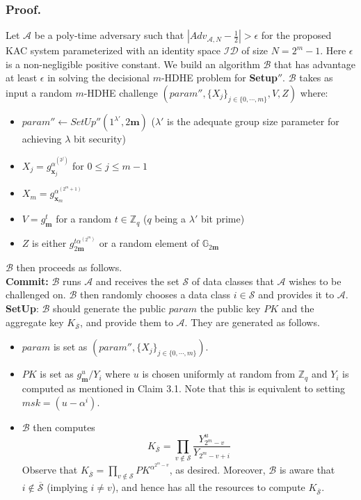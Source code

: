 \subsubsection{Proof.} Let $\mathcal{A}$ be a poly-time adversary such that $|Adv_{\mathcal{A},N}-\frac{1}{2}| > \epsilon$ for the proposed KAC system parameterized with an identity space $\mathcal{ID}$ of size $N=2^m-1$. Here $\epsilon$ is a non-negligible positive constant. We build an algorithm $\mathcal{B}$ that has advantage at least $\epsilon$ in solving the decisional $m$-HDHE problem for \textbf{Setup}$''$. $\mathcal{B}$ takes as input a random $m$-HDHE challenge $(param'',\{X_j\}_{j\in\{0,\cdots,m\}},V,Z)$ where:
\begin{itemize}
 \item $param''\leftarrow SetUp''(1^{\lambda'},2\mathbf{m})$ ($\lambda'$ is the adequate group size parameter for achieving $\lambda$ bit security)
 \item $X_j=g^{\alpha^{(2^j)}}_{\mathbf{x}_j}$ for $0\leq j \leq m-1$
 \item $X_m=g^{\alpha^{(2^m+1)}}_{\mathbf{x}_m}$
 \item $V=g^{t}_{\mathbf{m}}$ for a random $t\in\mathbb{Z}_q$ ($q$ being a $\lambda'$ bit prime)
 \item $Z$ is either $g^{t\alpha^{(2^m)}}_{2\mathbf{m}}$ or a random element of $\mathbb{G}_{2\mathbf{m}}$
\end{itemize}
\noindent $\mathcal{B}$ then proceeds as follows.\\

\noindent \textbf{Commit:} $\mathcal{B}$ runs $\mathcal{A}$ and receives the set $\mathcal{S}$ of data classes that $\mathcal{A}$ wishes to be challenged on. $\mathcal{B}$ then randomly chooses a data class $i\in\mathcal{S}$ and provides it to $\mathcal{A}$.\\
 
\noindent \textbf{SetUp}: $\mathcal{B}$ should generate the public $param$ the public key $PK$ and the aggregate key $K_{\overline{\mathcal{S}}}$, and provide them to $\mathcal{A}$. They are generated as follows.
\begin{itemize}
  \item $param$ is set as $(param'',\{X_j\}_{j\in\{0,\cdots,m\}})$.
  \item $PK$ is set as ${g^u_{\mathbf{m}}}/{Y_i}$ where $u$ is chosen uniformly at random from $\mathbb{Z}_q$ and $Y_i$ is computed as mentioned in Claim 3.1. Note that this is equivalent to setting $msk=(u-\alpha^i)$.
  \item $\mathcal{B}$ then computes   
  \begin{equation}
   K_{\overline{\mathcal{S}}} = \prod_{v\notin\mathcal{S}}\frac{Y^{u}_{2^m-v}}{Y_{2^m-v+i}}\nonumber
  \end{equation}
  \noindent Observe that $K_{\overline{\mathcal{S}}}=\prod_{v\notin\mathcal{S}}PK^{\alpha^{2^m-v}}$, as desired. Moreover, $\mathcal{B}$ is aware that $i\notin \overline{\mathcal{S}}$ (implying $i\neq v$), and hence has all the resources to compute $K_{\overline{\mathcal{S}}}$.  
\end{itemize}
 
